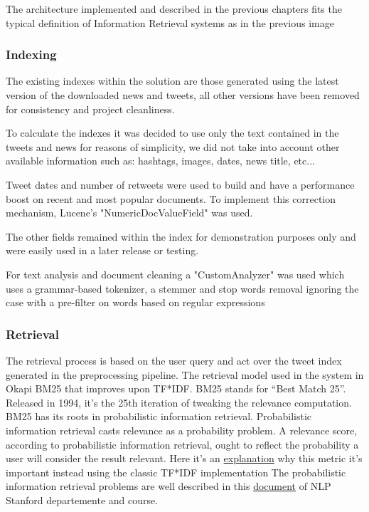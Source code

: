 \documentclass[11pt, english]{article}
\begin{document}
The architecture implemented and described in the previous chapters fits the typical definition of Information Retrieval systems as in the previous image

\subsubsection{Indexing}

The existing indexes within the solution are those generated using the latest version of the downloaded news and tweets, all other versions have been removed for consistency and project cleanliness.

To calculate the indexes it was decided to use only the text contained in the tweets and news for reasons of simplicity, we did not take into account other available information such as: hashtags, images, dates, news title, etc...

Tweet dates and number of retweets were used to build and have a performance boost on recent and most popular documents. To implement this correction mechanism, Lucene's "NumericDocValueField" was used.

The other fields remained within the index for demonstration purposes only and were easily used in a later release or testing.

For text analysis and document cleaning a "CustomAnalyzer" was used which uses a grammar-based tokenizer, a stemmer and stop words removal ignoring the case with a pre-filter on words based on regular expressions

\subsubsection{Retrieval}

The retrieval process is based on the user query and act over the tweet index generated in the preprocessing pipeline.
The retrieval model used in the system in Okapi BM25 that improves upon TF*IDF. 
\break
BM25 stands for “Best Match 25”. Released in 1994, it’s the 25th iteration of tweaking the relevance computation. BM25 has its roots in probabilistic information retrieval. Probabilistic information retrieval casts relevance as a probability problem. A relevance score, according to probabilistic information retrieval, ought to reflect the probability a user will consider the result relevant.
\break
Here it's an \hyperlink{https://opensourceconnections.com/blog/2015/10/16/bm25-the-next-generation-of-lucene-relevation/}{explanation} why this metric it's important instead using the classic TF*IDF implementation
\newline
The probabilistic information retrieval problems are well described in this \hyperlink{https://nlp.stanford.edu/IR-book/html/htmledition/probabilistic-information-retrieval-1.html}{document} of NLP Stanford departemente and course.
\newline
\end{document}
